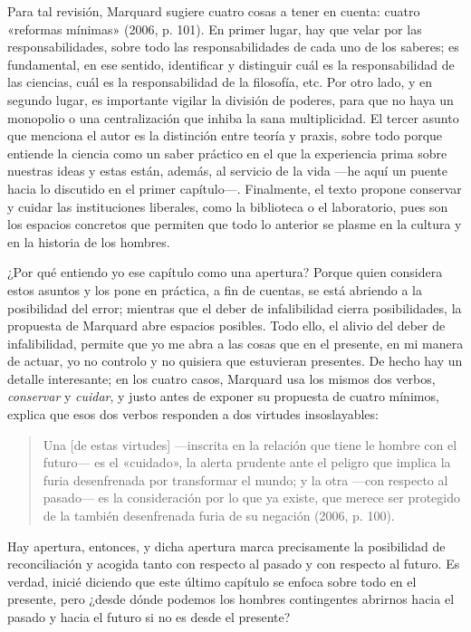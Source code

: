 \begin{refsection}
Para tal revisión, Marquard sugiere cuatro cosas a tener en cuenta: cuatro «reformas mínimas» (2006, p. 101). En primer lugar, hay que velar por las responsabilidades, sobre todo las responsabilidades de cada uno de los saberes; es fundamental, en ese sentido, identificar y distinguir cuál es la responsabilidad de las ciencias, cuál es la responsabilidad de la filosofía, etc. Por otro lado, y en segundo lugar, es importante vigilar la división de poderes, para que no haya un monopolio o una centralización que inhiba la sana multiplicidad. El tercer asunto que menciona el autor es la distinción entre teoría y praxis, sobre todo porque entiende la ciencia como un saber práctico en el que la experiencia prima sobre nuestras ideas y estas están, además, al servicio de la vida ---he aquí un puente hacia lo discutido en el primer capítulo---. Finalmente, el texto propone conservar y cuidar las instituciones liberales, como la biblioteca o el laboratorio, pues son los espacios concretos que permiten que todo lo anterior se plasme en la cultura y en la historia de los hombres.


¿Por qué entiendo yo ese capítulo como una apertura? Porque quien considera estos asuntos y los pone en práctica, a fin de cuentas, se está abriendo a la posibilidad del error; mientras que el deber de infalibilidad cierra posibilidades, la propuesta de Marquard abre espacios posibles. Todo ello, el alivio del deber de infalibilidad, permite que yo me abra a las cosas que en el presente, en mi manera de actuar, yo no controlo y no quisiera que estuvieran presentes. De hecho hay un detalle interesante; en los cuatro casos, Marquard usa los mismos dos verbos, \emph{conservar} y \emph{cuidar}, y justo antes de exponer su propuesta de cuatro mínimos, explica que esos dos verbos responden a dos virtudes insoslayables:

\begin{quote}
Una {[}de estas virtudes{]} ---inscrita en la relación que tiene le hombre con el futuro--- es el «cuidado», la alerta prudente ante el peligro que implica la furia desenfrenada por transformar el mundo; y la otra ---con respecto al pasado--- es la consideración por lo que ya existe, que merece ser protegido de la también desenfrenada furia de su negación (2006, p. 100).
\end{quote}

Hay apertura, entonces, y dicha apertura marca precisamente la posibilidad de reconciliación y acogida tanto con respecto al pasado y con respecto al futuro. Es verdad, inicié diciendo que este último capítulo se enfoca sobre todo en el presente, pero ¿desde dónde podemos los hombres contingentes abrirnos hacia el pasado y hacia el futuro si no es desde el presente?


\end{refsection}
